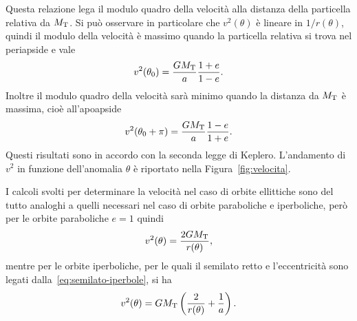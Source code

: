 {Questa relazione lega il modulo quadro della velocità alla
distanza della particella relativa da $M_\textup{T}$. Si può osservare in
particolare che $v^2(\theta)$ è lineare in $1/r(\theta)$, quindi il modulo della
velocità è massimo quando la particella relativa si trova nel periapside e vale
\begin{equation}
  v^2(\theta_0) = \frac{GM_\textup{T}}{a}\frac{1+e}{1-e}.
\end{equation}
Inoltre il modulo quadro della velocità sarà minimo quando la distanza da
$M_\textup{T}$ è massima, cioè all'apoapside
\begin{equation}
  v^2(\theta_0+\pi) = \frac{GM_\textup{T}}{a}\frac{1-e}{1+e}.
\end{equation}
Questi risultati sono in accordo con la seconda legge di Keplero. L'andamento di
$v^2$ in funzione dell'anomalia $\theta$ è riportato nella
Figura~\ref{fig:velocita}.

I calcoli svolti per determinare la velocità nel caso di orbite ellittiche sono
del tutto analoghi a quelli necessari nel caso di orbite paraboliche e
iperboliche, però per le orbite paraboliche $e=1$ quindi
\begin{equation}
  \label{eq:velocita-parabola}
  v^2(\theta) = \frac{2GM_\textup{T}}{r(\theta)},
\end{equation}
mentre per le orbite iperboliche, per le quali il semilato retto e
l'eccentricità sono legati dalla~\eqref{eq:semilato-iperbole}, si ha
\begin{equation}
  \label{eq:velocita-iperbole}
  v^2(\theta) = GM_\textup{T}
    \left(
      \frac{2}{r(\theta)} + \frac{1}{a}
    \right).
\end{equation}

}
